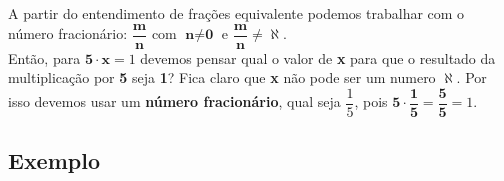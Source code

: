  	A partir do entendimento de frações equivalente podemos trabalhar com o número fracionário: $\dfrac{\textbf{m}}{\textbf{n}}$ com $\textbf{n} \neq \textbf{0}$ e $\dfrac{\textbf{m}}{\textbf{n}} \neq \aleph $. \\
 	
 	\noindent Então, para $\textbf{5}\cdot \textbf{x} = 1$ devemos pensar qual o valor de \textbf{x} para que o resultado da multiplicação por \textbf{5} seja \textbf{1}? Fica claro que \textbf{x} não pode ser um numero $\aleph $. Por isso devemos usar um \textbf{número fracionário}, qual seja $\dfrac{1}{5}$, pois $\textbf{5}\cdot \dfrac{\textbf{1}}{\textbf{5}} = \dfrac{\textbf{5}}{\textbf{5}} = 1$.
 	
 
 \subsection{Exemplo}
